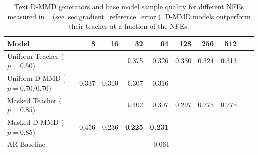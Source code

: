 \begin{table}[t]
    \centering
    \begin{tabular}{l|rrrrrrrrr}
        \toprule
         \bfseries Model & 8 & 16 & 32 & 64 & 128 & 256 & 512 \\\midrule
        Uniform Teacher ($p=0.50$) & & & 0.375 & 0.326 & 0.330 & 0.324 & 0.313  \\
        Uniform D-MMD ($p=0.70/0.70$) & 0.337 & 0.310 & 0.307 & 0.316 \\ \midrule
        Masked Teacher ($p=0.85$) & & & 0.402 & 0.307 & 0.297 & 0.275 & 0.275 & \\
        Masked D-MMD ($p=0.85$) & 0.456 & 0.236 & \textbf{0.225} & \textbf{0.231} \\ \midrule
        AR Baseline & \multicolumn{8}{c}{0.061} \\
        \bottomrule
    \end{tabular}
    \caption{Text D-MMD generators and base model sample quality for different NFEs measured in \gge~ (see \autoref{sec:gradient_reference_error}).
    D-MMD models outperform their teacher at a fraction of the NFEs.}
    \label{tab:text_mmd_overview}
\end{table}
